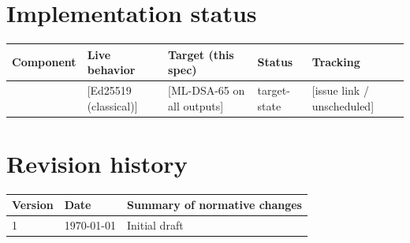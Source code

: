 \documentclass[11pt]{article}
\begin{document}
\section{Implementation status}
\label{sec:impl-status}
\begin{center}
\begin{tabular}{@{}p{2.2cm}p{2.8cm}p{2.8cm}ll@{}}
\toprule
Component & Live behavior & Target (this spec) & Status & Tracking \\
\midrule
[Output signatures] & [Ed25519 (classical)] & [ML-DSA-65 on all outputs] & target-state & [issue link / unscheduled] \\
\bottomrule
\end{tabular}
\end{center}

\section{Revision history}
\begin{center}
\begin{tabular}{@{}lll@{}}
\toprule
Version & Date & Summary of normative changes \\
\midrule
1 & \today & Initial draft \\
\bottomrule
\end{tabular}
\end{center}
\end{document}
